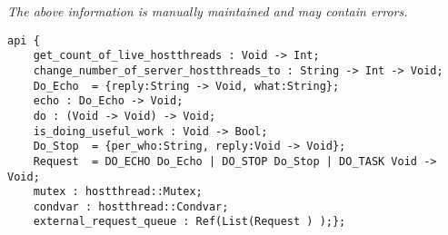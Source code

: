 \label{api:Io\_Bound\_Task\_Hostthreads}

{\tiny \it The above information is manually maintained and may contain errors.}
\begin{verbatim}
api {
    get_count_of_live_hostthreads : Void -> Int;
    change_number_of_server_hostthreads_to : String -> Int -> Void;
    Do_Echo  = {reply:String -> Void, what:String};
    echo : Do_Echo -> Void;
    do : (Void -> Void) -> Void;
    is_doing_useful_work : Void -> Bool;
    Do_Stop  = {per_who:String, reply:Void -> Void};
    Request  = DO_ECHO Do_Echo | DO_STOP Do_Stop | DO_TASK Void -> Void;
    mutex : hostthread::Mutex;
    condvar : hostthread::Condvar;
    external_request_queue : Ref(List(Request ) );};
\end{verbatim}
